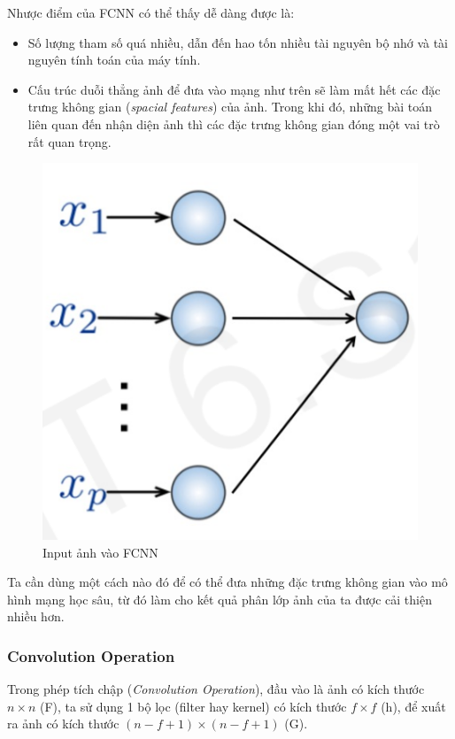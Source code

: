 \documentclass[a4paper, 12pt]{article}
\begin{document}
Nhược điểm của FCNN có thể thấy dễ dàng được là: 
\begin{itemize}
    \item Số lượng tham số quá nhiều, dẫn đến hao tốn nhiều tài nguyên bộ nhớ và tài nguyên tính toán của máy tính.
    \item Cấu trúc duỗi thẳng ảnh để đưa vào mạng như trên sẽ làm mất hết các đặc trưng không gian (\textit{spacial features}) của ảnh. Trong khi đó, những bài toán liên quan đến nhận diện ảnh thì các đặc trưng không gian đóng một vai trò rất quan trọng.
\end{itemize}

    \begin{figure}[H]
        \begin{center}
            \includegraphics[scale=0.4]{img/img-to-FCNN.png}
            \caption{Input ảnh vào FCNN}
        \end{center}
    \end{figure}

Ta cần dùng một cách nào đó để có thể  đưa những đặc trưng không gian vào mô hình mạng học sâu, từ đó làm cho kết quả phân lớp ảnh của ta được cải thiện nhiều hơn.

\subsubsection{Convolution Operation}
Trong phép tích chập (\textit{Convolution Operation}), đầu vào là ảnh có kích thước $n \times n$ (F), ta sử dụng 1 bộ lọc (filter hay kernel) có kích thước $f \times f$ (h), để xuất ra ảnh có kích thước $(n - f + 1) \times (n - f + 1)$ (G).
\end{document}

